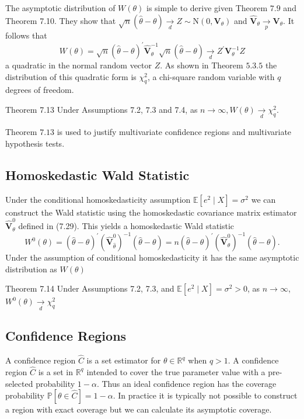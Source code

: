 \documentclass[10pt]{article}
\begin{document}
The asymptotic distribution of $W(\theta)$ is simple to derive given Theorem $7.9$ and Theorem 7.10. They show that $\sqrt{n}(\widehat{\theta}-\theta) \underset{d}{\longrightarrow} Z \sim \mathrm{N}\left(0, \boldsymbol{V}_{\theta}\right)$ and $\widehat{\boldsymbol{V}}_{\theta} \underset{p}{\longrightarrow} \boldsymbol{V}_{\theta}$. It follows that
$$
W(\theta)=\sqrt{n}(\widehat{\theta}-\theta)^{\prime} \widehat{\boldsymbol{V}}_{\theta}^{-1} \sqrt{n}(\widehat{\theta}-\theta) \underset{d}{\longrightarrow} Z^{\prime} \boldsymbol{V}_{\theta}^{-1} Z
$$
a quadratic in the normal random vector $Z$. As shown in Theorem $5.3 .5$ the distribution of this quadratic form is $\chi_{q}^{2}$, a chi-square random variable with $q$ degrees of freedom.

Theorem 7.13 Under Assumptions 7.2, $7.3$ and 7.4, as $n \rightarrow \infty, W(\theta) \underset{d}{\longrightarrow} \chi_{q}^{2}$.

Theorem $7.13$ is used to justify multivariate confidence regions and multivariate hypothesis tests.

\subsection{Homoskedastic Wald Statistic}
Under the conditional homoskedasticity assumption $\mathbb{E}\left[e^{2} \mid X\right]=\sigma^{2}$ we can construct the Wald statistic using the homoskedastic covariance matrix estimator $\widehat{\boldsymbol{V}}_{\theta}^{0}$ defined in (7.29). This yields a homoskedastic Wald statistic
$$
W^{0}(\theta)=(\widehat{\theta}-\theta)^{\prime}\left(\widehat{\boldsymbol{V}}_{\widehat{\theta}}^{0}\right)^{-1}(\widehat{\theta}-\theta)=n(\widehat{\theta}-\theta)^{\prime}\left(\widehat{\boldsymbol{V}}_{\theta}^{0}\right)^{-1}(\widehat{\theta}-\theta) .
$$
Under the assumption of conditional homoskedasticity it has the same asymptotic distribution as $W(\theta)$

Theorem 7.14 Under Assumptions 7.2, 7.3, and $\mathbb{E}\left[e^{2} \mid X\right]=\sigma^{2}>0$, as $n \rightarrow \infty$, $W^{0}(\theta) \underset{d}{\longrightarrow} \chi_{q}^{2}$

\subsection{Confidence Regions}
A confidence region $\widehat{C}$ is a set estimator for $\theta \in \mathbb{R}^{q}$ when $q>1$. A confidence region $\widehat{C}$ is a set in $\mathbb{R}^{q}$ intended to cover the true parameter value with a pre-selected probability $1-\alpha$. Thus an ideal confidence region has the coverage probability $\mathbb{P}[\theta \in \widehat{C}]=1-\alpha$. In practice it is typically not possible to construct a region with exact coverage but we can calculate its asymptotic coverage.
\end{document}

